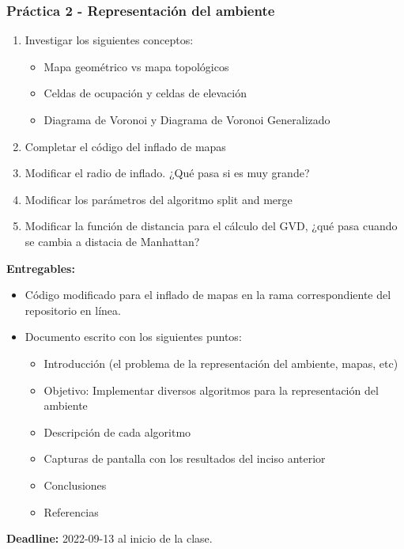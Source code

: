 \documentclass[10pt,spanish,aspectratio=1610]{beamer}
\begin{document}
\begin{frame}\frametitle{Práctica 2 - Representación del ambiente}
  \begin{enumerate}
  \item Investigar los siguientes conceptos:
    \begin{itemize}
    \item Mapa geométrico vs mapa topológicos
    \item Celdas de ocupación y celdas de elevación
    \item Diagrama de Voronoi y Diagrama de Voronoi Generalizado
    \end{itemize}
  \item Completar el código del inflado de mapas
  \item Modificar el radio de inflado. ¿Qué pasa si es muy grande?
  \item Modificar los parámetros del algoritmo split and merge
  \item Modificar la función de distancia para el cálculo del GVD, ¿qué pasa cuando se cambia a distacia de Manhattan?
  \end{enumerate}
  \textbf{Entregables:}
  \begin{itemize}
  \item Código modificado para el inflado de mapas en la rama correspondiente del repositorio en línea.
  \item Documento escrito con los siguientes puntos:
    \begin{itemize}
    \item Introducción (el problema de la representación del ambiente, mapas, etc)
    \item Objetivo: Implementar diversos algoritmos para la representación del ambiente
    \item Descripción de cada algoritmo
    \item Capturas de pantalla con los resultados del inciso anterior
    \item Conclusiones
    \item Referencias
    \end{itemize}
  \end{itemize}
  \textbf{Deadline: } 2022-09-13 al inicio de la clase. 
\end{frame}
\end{document}
